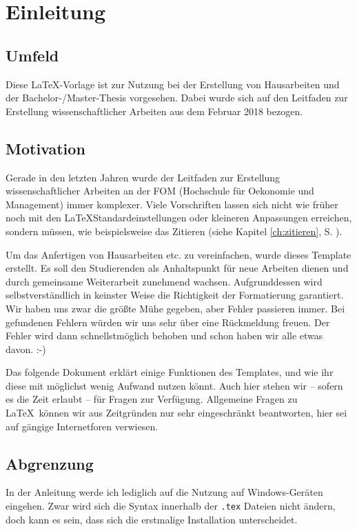 
\chapter{Einleitung}\label{ch:einleitung}

\section{Umfeld}

Diese \LaTeX -Vorlage ist zur Nutzung bei der Erstellung von Hausarbeiten und der Bachelor-/Master-Thesis vorgesehen. 
Dabei wurde sich auf den Leitfaden zur Erstellung wissenschaftlicher Arbeiten aus dem Februar 2018 bezogen.\autocite[Vgl.][]{leitfaden}

\section{Motivation}

Gerade in den letzten Jahren wurde der Leitfaden zur Erstellung wissenschaftlicher Arbeiten an der FOM (Hochschule für Oekonomie und Management) immer komplexer. 
Viele Vorschriften lassen sich nicht wie früher noch mit den \LaTeX\-Standardeinstellungen oder kleineren Anpassungen erreichen, sondern müssen, wie beispielsweise das Zitieren (siehe Kapitel \ref{ch:zitieren}, S. \pageref{ch:zitieren}).

Um das Anfertigen von Hausarbeiten etc. zu vereinfachen, wurde dieses Template erstellt. 
Es soll den Studierenden als Anhaltspunkt für neue Arbeiten dienen und durch gemeinsame Weiterarbeit zunehmend wachsen.
Aufgrunddessen wird selbstverständlich in keinster Weise die Richtigkeit der Formatierung garantiert. 
Wir haben uns zwar die größte Mühe gegeben, aber Fehler passieren immer. 
Bei gefundenen Fehlern würden wir uns sehr über eine Rückmeldung freuen. 
Der Fehler wird dann schnellstmöglich behoben und schon haben wir alle etwas davon. :-)

Das folgende Dokument erklärt einige Funktionen des Templates, und wie ihr diese mit möglichst wenig Aufwand nutzen könnt. Auch hier stehen wir -- sofern es die Zeit erlaubt -- für Fragen zur Verfügung. Allgemeine Fragen zu \LaTeX\ können wir aus Zeitgründen nur sehr eingeschränkt beantworten, hier sei auf gängige Internetforen verwiesen.

\section{Abgrenzung}
In der Anleitung werde ich lediglich auf die Nutzung auf Windows-Geräten eingehen. 
Zwar wird sich die Syntax innerhalb der \texttt{.tex} Dateien nicht ändern, doch kann es sein, dass sich die erstmalige Installation unterscheidet.